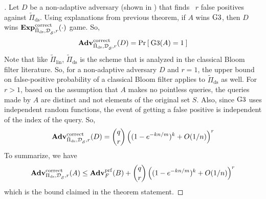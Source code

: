 \begin{proof}[]
Let $D$ be a non-adaptive adversary (shown in ) that finds ~$r$ false positives against $\tilde{\Pi}_{\mathrm{ds}}$. Using explanations from previous theorem, if $A$ wins $\text{G3}$, then $D$ wins $\mathrm{\mathbf{Exp}}^{\mathrm{correct}}_{\tilde{\Pi}_{\mathrm{ds}},\mathcal{D}_{{\cal S}}^{},r}(\cdot)$ game. So, 
\begin{equation*}
\mathrm{\mathbf{Adv}}^{\mathrm{correct}}_{\tilde{\Pi}_{\mathrm{ds}},\mathcal{D}_{{\cal S}}^{},r}(D) = \Pr\left[\: \text{G3}(A) = 1 \:\right]\label{eq:2T8}
\end{equation*}
Note that like $\tilde{\Pi}_{\mathrm{lin}}$, $\tilde{\Pi}_{\mathrm{ds}}$ is the scheme that is analyzed in the classical Bloom filter literature. So, for a non-adaptive adversary $D$ and $r=1$, the upper bound on false-positive probability of a classical Bloom filter applies to $\tilde{\Pi}_{\mathrm{ds}}$ as well. For $r > 1$, based on the assumption that $A$ makes no pointless queries, the queries made by $A$ are distinct and not elements of the original set $S$. Also, since $\text{G3}$ uses independent random functions, the event of getting a false positive is independent of the index of the query. So,
\begin{equation*}
\mathrm{\mathbf{Adv}}^{\mathrm{correct}}_{\tilde{\Pi}_{\mathrm{ds}},\mathcal{D}_{{\cal S}}^{},r}(D) =   {\dbinom{q}{r}} \left( (1-e^{-kn/m})^k + O(1/n) \right)^r
\end{equation*}
\noindent
To summarize, we have
\[
\mathrm{\mathbf{Adv}}^{\mathrm{correct}}_{\Pi_{\mathrm{ds}},\mathcal{D}_{{\cal S}}^{},r}(A) \leq  \mathbf{Adv}^{\mathrm{prf}}_{F}(B)  + {\dbinom{q}{r}} \left( (1-e^{-kn/m})^k + O(1/n) \right)^r
\]
which is the bound claimed in the theorem statement. %


\end{proof}
